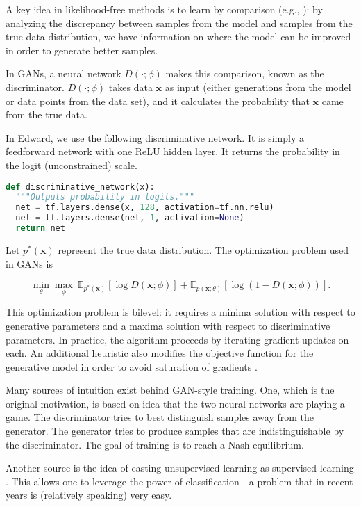 A key idea in likelihood-free methods is to learn by
comparison (e.g., \citet{rubin1984bayesianly,gretton2012kernel}): by
analyzing the discrepancy between samples from the model and samples
from the true data distribution, we have information on where the
model can be improved in order to generate better samples.

In GANs, a neural network $D(\cdot;\phi)$ makes this comparison,
known as the discriminator.
$D(\cdot;\phi)$ takes data $\mathbf{x}$ as input (either
generations from the model or data points from the data set), and it
calculates the probability that $\mathbf{x}$ came from the true data.

In Edward, we use the following discriminative network. It is simply a
feedforward network with one ReLU hidden layer. It returns the
probability in the logit (unconstrained) scale.

\begin{lstlisting}[language=Python]
def discriminative_network(x):
  """Outputs probability in logits."""
  net = tf.layers.dense(x, 128, activation=tf.nn.relu)
  net = tf.layers.dense(net, 1, activation=None)
  return net
\end{lstlisting}

Let $p^*(\mathbf{x})$ represent the true data distribution.
The optimization problem used in GANs is

\begin{equation*}
\min_\theta \max_\phi~
\mathbb{E}_{p^*(\mathbf{x})} [ \log D(\mathbf{x}; \phi) ]
+ \mathbb{E}_{p(\mathbf{x}; \theta)} [ \log (1 - D(\mathbf{x}; \phi)) ].
\end{equation*}

This optimization problem is bilevel: it requires a minima solution
with respect to generative parameters and a maxima solution with
respect to discriminative parameters.
In practice, the algorithm proceeds by iterating gradient updates on
each. An additional heuristic also modifies the objective function for the
generative model in order to avoid saturation of gradients
\citep{goodfellow2014on}.

Many sources of intuition exist behind GAN-style training. One, which
is the original motivation, is based on idea that the two neural
networks are playing a game. The discriminator tries to best
distinguish samples away from the generator. The generator tries
to produce samples that are indistinguishable by the discriminator.
The goal of training is to reach a Nash equilibrium.

Another source is the idea of casting unsupervised learning as
supervised learning
\citep{gutmann2010noise,gutmann2014statistical}.
This allows one to leverage the power of classification—a problem that
in recent years is (relatively speaking) very easy.

